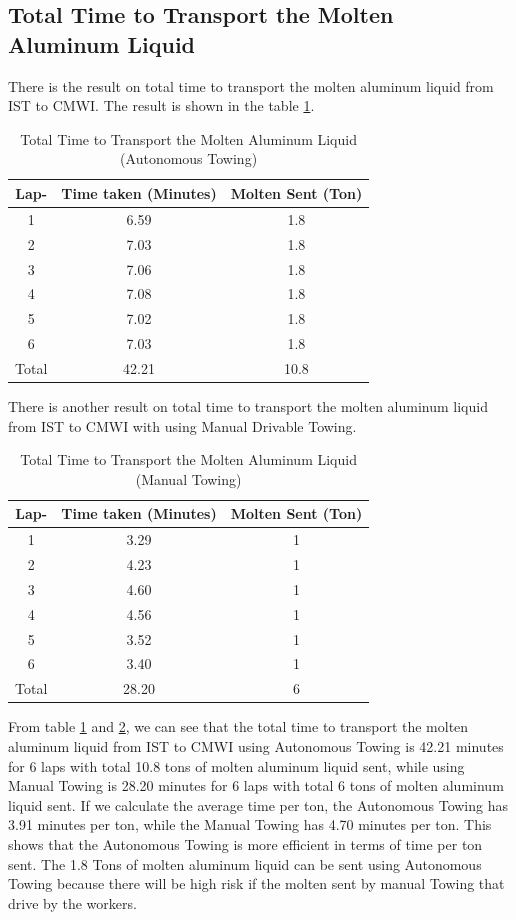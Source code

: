 \documentclass[conference]{IEEEtran}
\begin{document}
\subsection{Total Time to Transport the Molten Aluminum Liquid}
There is the result on total time to transport the molten aluminum liquid from IST to CMWI. The result is shown in the table \ref{tab:total_time_transport}.
\begin{table}[H]
	\centering
	\caption{Total Time to Transport the Molten Aluminum Liquid (Autonomous Towing)}
	\label{tab:total_time_transport}
	\begin{tabular}{|c|c|c|}
		\hline
		\textbf{Lap-} & \textbf{Time taken (Minutes)} & \textbf{Molten Sent (Ton)} \\ \hline
		1 & 6.59 & 1.8 \\ \hline
		2 & 7.03 & 1.8 \\ \hline
		3 & 7.06 & 1.8 \\ \hline
		4 & 7.08 & 1.8 \\ \hline
		5 & 7.02 & 1.8 \\ \hline
		6 & 7.03 & 1.8 \\ \hline
		Total & 42.21 & 10.8 \\ \hline
	\end{tabular}
\end{table} 

There is another result on total time to transport the molten aluminum liquid from IST to CMWI with using Manual Drivable Towing. 

\begin{table}[H]
	\centering
	\caption{Total Time to Transport the Molten Aluminum Liquid (Manual Towing)}
	\label{tab:total_time_transport_manual}
	\begin{tabular}{|c|c|c|}
		\hline
		\textbf{Lap-} & \textbf{Time taken (Minutes)} & \textbf{Molten Sent (Ton)} \\ \hline
		1 & 3.29 & 1 \\ \hline
		2 & 4.23 & 1 \\ \hline
		3 & 4.60 & 1 \\ \hline
		4 & 4.56 & 1 \\ \hline
		5 & 3.52 & 1 \\ \hline
		6 & 3.40 & 1 \\ \hline
		Total & 28.20 & 6 \\ \hline
	\end{tabular}
\end{table} 

From table \ref{tab:total_time_transport} and \ref{tab:total_time_transport_manual}, we can see that the total time to transport the molten aluminum liquid from IST to CMWI using Autonomous Towing is 42.21 minutes for 6 laps with total 10.8 tons of molten aluminum liquid sent, while using Manual Towing is 28.20 minutes for 6 laps with total 6 tons of molten aluminum liquid sent. If we calculate the average time per ton, the Autonomous Towing has 3.91 minutes per ton, while the Manual Towing has 4.70 minutes per ton. This shows that the Autonomous Towing is more efficient in terms of time per ton sent. The 1.8 Tons of molten aluminum liquid can be sent using Autonomous Towing because there will be high risk if the molten sent by manual Towing that drive by the workers.
\end{document}
